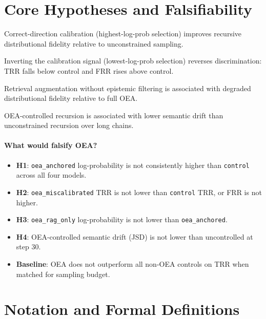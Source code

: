 \documentclass[11pt]{article}
\begin{document}
\section{Core Hypotheses and Falsifiability}
\label{sec:hypotheses}

\begin{description}[style=nextline]
  \item[H1 (Calibration Direction)] Correct-direction calibration (highest-log-prob selection) improves recursive distributional fidelity relative to unconstrained sampling.
  \item[H2 (Miscalibration Reversal)] Inverting the calibration signal (lowest-log-prob selection) reverses discrimination: TRR falls below control and FRR rises above control.
  \item[H3 (RAG without Filter)] Retrieval augmentation without epistemic filtering is associated with degraded distributional fidelity relative to full OEA.
  \item[H4 (Memory Drift)] OEA-controlled recursion is associated with lower semantic drift than unconstrained recursion over long chains.
\end{description}

\paragraph{What would falsify OEA?}
\begin{itemize}[noitemsep]
  \item \textbf{H1}: \texttt{oea\_anchored} log-probability is not consistently higher than \texttt{control} across all four models.
  \item \textbf{H2}: \texttt{oea\_miscalibrated} TRR is not lower than \texttt{control} TRR, or FRR is not higher.
  \item \textbf{H3}: \texttt{oea\_rag\_only} log-probability is not lower than \texttt{oea\_anchored}.
  \item \textbf{H4}: OEA-controlled semantic drift (JSD) is not lower than uncontrolled at step 30.
  \item \textbf{Baseline}: OEA does not outperform all non-OEA controls on TRR when matched for sampling budget.
\end{itemize}

\section{Notation and Formal Definitions}
\label{sec:notation}
\end{document}
